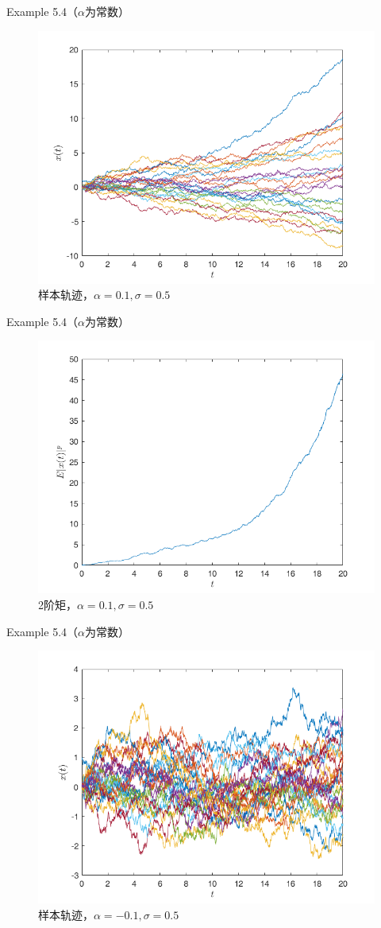 \documentclass[10pt,aspectratio=43]{beamer}
\begin{document}
\begin{frame}{Example 5.4（$ \alpha $为常数）}
\begin{figure}
\centering
\includegraphics[width=0.7\linewidth]{../figures/1}
\caption{样本轨迹，$ \alpha=0.1,\sigma=0.5 $}
\end{figure}
\end{frame}

\begin{frame}{Example 5.4（$ \alpha $为常数）}
\begin{figure}
\centering
\includegraphics[width=0.7\linewidth]{../figures/2}
\caption{2阶矩，$ \alpha=0.1,\sigma=0.5 $}
\end{figure}
\end{frame}

\begin{frame}{Example 5.4（$ \alpha $为常数）}
\begin{figure}
\centering
\includegraphics[width=0.7\linewidth]{../figures/3}
\caption{样本轨迹，$ \alpha=-0.1,\sigma=0.5 $}
\end{figure}
\end{frame}
\end{document}
